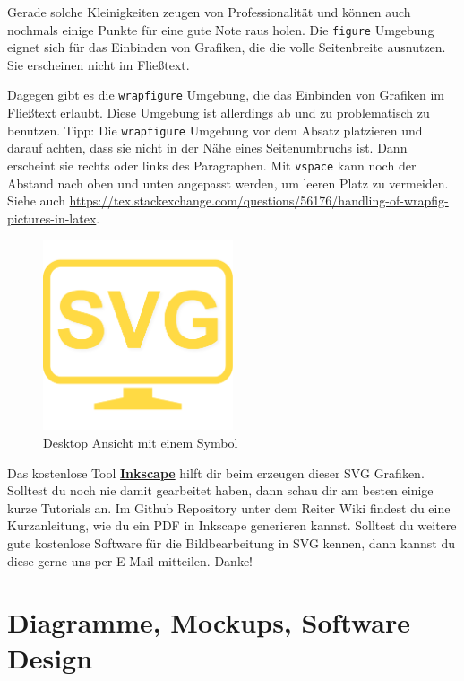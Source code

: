 Gerade solche Kleinigkeiten zeugen von Professionalität und können auch nochmals einige Punkte für eine gute Note raus holen. Die \texttt{figure} Umgebung eignet sich für das Einbinden von Grafiken, die die volle Seitenbreite ausnutzen. Sie erscheinen nicht im Fließtext.

Dagegen gibt es die \texttt{wrapfigure} Umgebung, die das Einbinden von Grafiken im Fließtext erlaubt.
Diese Umgebung ist allerdings ab und zu problematisch zu benutzen.
Tipp: Die \texttt{wrapfigure} Umgebung vor dem Absatz platzieren und darauf achten, dass sie nicht in der Nähe eines Seitenumbruchs ist.
Dann erscheint sie rechts oder links des Paragraphen. Mit \texttt{vspace} kann noch der Abstand nach oben und unten angepasst werden, um leeren Platz zu vermeiden.
Siehe auch \url{https://tex.stackexchange.com/questions/56176/handling-of-wrapfig-pictures-in-latex}.

\begin{figure}[ht]
	\centering
	\includegraphics[width=0.50\textwidth]{Bilder/desktop-screen.pdf} 
	\caption{Desktop Ansicht mit einem Symbol}
	\label{fig:Referenz-auf-Bild}
\end{figure}

Das kostenlose Tool \href{https://inkscape.org/}{\textbf{Inkscape}} hilft dir beim erzeugen dieser SVG Grafiken. Solltest du noch nie damit gearbeitet haben, dann schau dir am besten einige kurze Tutorials an. Im Github Repository unter dem Reiter Wiki findest du eine Kurzanleitung, wie du ein PDF in Inkscape generieren kannst. Solltest du weitere gute kostenlose Software für die Bildbearbeitung in SVG kennen, dann kannst du diese gerne uns per E-Mail mitteilen. Danke!

\section{Diagramme, Mockups, Software Design}

